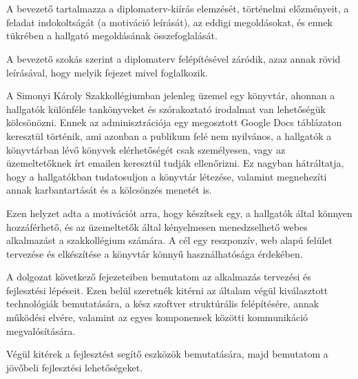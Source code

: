 \chapter{\bevezetes}

A bevezető tartalmazza a diplomaterv-kiírás elemzését, történelmi előzményeit, a feladat indokoltságát (a motiváció leírását), az eddigi megoldásokat, és ennek tükrében a hallgató megoldásának összefoglalását.

A bevezető szokás szerint a diplomaterv felépítésével záródik, azaz annak rövid leírásával, hogy melyik fejezet mivel foglalkozik.

A Simonyi Károly Szakkollégiumban jelenleg üzemel egy könyvtár, ahonnan a hallgatók különféle tankönyveket és szórakoztató irodalmat van lehetőségük kölcsönözni.
Ennek az adminisztrációja egy megosztott Google Docs táblázaton keresztül történik, ami azonban a publikum felé nem nyilvános, a hallgatók a könyvtárban lévő könyvek elérhetőségét csak személyesen,
vagy az üzemeltetőknek írt emailen keresztül tudják ellenőrizni. Ez nagyban hátráltatja, hogy a hallgatókban tudatosuljon a könyvtár létezése, valamint  megnehezíti annak karbantartását és a kölcsönzés menetét is.

Ezen helyzet adta a motivációt arra, hogy készítsek egy, a hallgatók által könnyen hozzáférhető, és az üzemeltetők által kényelmesen menedzselhető webes alkalmazást a szakkollégium számára.
A cél egy reszponzív, web alapú felület tervezése és elkészítése a könyvtár könnyű használhatósága érdekében.

A dolgozat következő fejezeteiben bemutatom az alkalmazás tervezési és fejlesztési lépéseit.
Ezen belül szeretnék kitérni az általam végül kiválasztott technológiák bemutatására, a kész szoftver struktúrális felépítésére,
annak működési elvére, valamint az egyes komponensek közötti kommunikáció megvalósítására.

Végül kitérek a fejlesztést segítő eszközök bemutatására, majd bemutatom a jövőbeli fejlesztési lehetőségeket.
